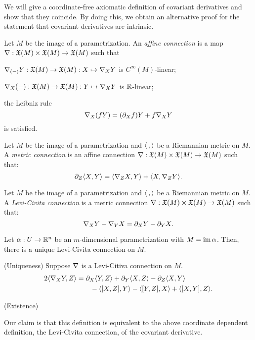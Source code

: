 \documentclass{../exp}
\def\a{\alpha}
\begin{document}
We will give a coordinate-free axiomatic definition of covariant derivatives and show that they coincide.
By doing this, we obtain an alternative proof for the statement that covariant derivatives are intrinsic.

\begin{defn}
Let $M$ be the image of a parametrization.
An \emph{affine connection} is a map $\del:\fX(M)\x\fX(M)\to\fX(M)$ such that
\begin{cond}
\item $\del_{(-)}Y:\fX(M)\to\fX(M):X\mapsto\del_XY$ is $C^\infty(M)$-linear;
\item $\del_X(-):\fX(M)\to\fX(M):Y\mapsto\del_XY$ is $\mathbb{R}$-linear;
\item the Leibniz rule
\[\del_X(fY)=(\pd_Xf)Y+f\del_XY\]
is satisfied.
\end{cond}
\end{defn}

\begin{defn}
Let $M$ be the image of a parametrization and $\langle\,,\rangle$ be a Riemannian metric on $M$.
A \emph{metric connection} is an affine connection $\del:\fX(M)\x\fX(M)\to\fX(M)$ such that:
\[\pd_Z\<X,Y\>=\<\del_ZX,Y\>+\<X,\del_ZY\>.\]
\end{defn}

\begin{defn}
Let $M$ be the image of a parametrization and $\langle\,,\rangle$ be a Riemannian metric on $M$.
A \emph{Levi-Civita connection} is a metric connection $\del:\fX(M)\x\fX(M)\to\fX(M)$ such that:
\[\del_XY-\del_YX=\pd_XY-\pd_YX.\]
\end{defn}

\begin{thm}
Let $\a:U\to\R^n$ be an $m$-dimensional parametrization with $M=\im\a$.
Then, there is a unique Levi-Civita connection on $M$.
\end{thm}
\begin{pf}
(Uniqueness)
Suppose $\nabla$ is a Levi-Citiva connection on $M$.
\begin{align*}
2\<\del_XY,Z\>&=\pd_X\<Y,Z\>+\pd_Y\<X,Z\>-\pd_Z\<X,Y\>\\
&\qquad-\<[X,Z],Y\>-\<[Y,Z],X\>+\<[X,Y],Z\>.
\end{align*}

(Existence)
\end{pf}

Our claim is that this definition is equivalent to the above coordinate dependent definition, the Levi-Civita connection, of the covariant derivative.
\end{document}

